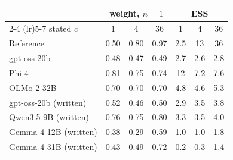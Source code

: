 \begin{tabular}{lcccccc}
\toprule
& \multicolumn{3}{c}{weight, $n = 1$} & \multicolumn{3}{c}{ESS} \\
\cmidrule(lr){2-4} \cmidrule(lr){5-7}
stated $c$ & $1$ & $4$ & $36$ & $1$ & $4$ & $36$ \\
\midrule
Reference & 0.50 & 0.80 & 0.97 & 2.5 & 13 & 36 \\
\midrule
gpt-oss-20b & 0.48 & 0.47 & 0.49 & 2.7 & 2.6 & 2.8 \\
Phi-4 & 0.81 & 0.75 & 0.74 & 12 & 7.2 & 7.6 \\
OLMo 2 32B & 0.70 & 0.70 & 0.70 & 4.8 & 4.6 & 5.3 \\
gpt-oss-20b (written) & 0.52 & 0.46 & 0.50 & 2.9 & 3.5 & 3.8 \\
Qwen3.5 9B (written) & 0.76 & 0.75 & 0.80 & 3.3 & 3.5 & 4.0 \\
Gemma 4 12B (written) & 0.38 & 0.29 & 0.59 & 1.0 & 1.0 & 1.8 \\
Gemma 4 31B (written) & 0.43 & 0.49 & 0.72 & 0.2 & 0.3 & 1.4 \\
\bottomrule
\end{tabular}
